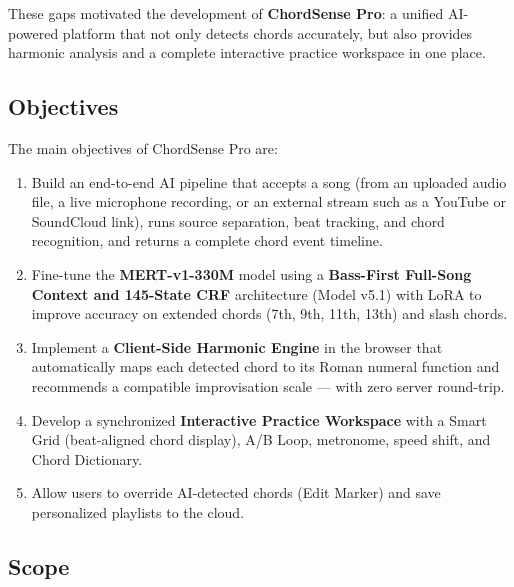 \documentclass[a4paper]{article}
\begin{document}
These gaps motivated the development of \textbf{ChordSense Pro}: a unified AI-powered platform that not only detects chords accurately, but also provides harmonic analysis and a complete interactive practice workspace in one place.

\subsection{Objectives}

The main objectives of ChordSense Pro are:
\begin{enumerate}
    \item Build an end-to-end AI pipeline that accepts a song (from an uploaded audio file, a live microphone recording, or an external stream such as a YouTube or SoundCloud link), runs source separation, beat tracking, and chord recognition, and returns a complete chord event timeline.
    \item Fine-tune the \textbf{MERT-v1-330M} model using a \textbf{Bass-First Full-Song Context and 145-State CRF} architecture (Model v5.1) with LoRA to improve accuracy on extended chords (7th, 9th, 11th, 13th) and slash chords.
    \item Implement a \textbf{Client-Side Harmonic Engine} in the browser that automatically maps each detected chord to its Roman numeral function and recommends a compatible improvisation scale --- with zero server round-trip.
    \item Develop a synchronized \textbf{Interactive Practice Workspace} with a Smart Grid (beat-aligned chord display), A/B Loop, metronome, speed shift, and Chord Dictionary.
    \item Allow users to override AI-detected chords (Edit Marker) and save personalized playlists to the cloud.
\end{enumerate}

\subsection{Scope}
\end{document}
